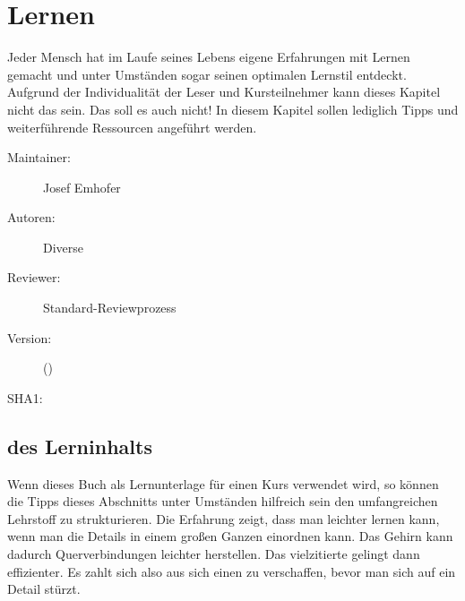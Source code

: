 \def\ChapterCode{LER}
\chapter
[\CO{[LER]} Lernen]
{Lernen} 

\ChapterIntro
{%
Jeder Mensch hat im Laufe seines Lebens eigene Erfahrungen
mit Lernen gemacht und unter Umständen sogar seinen
optimalen Lernstil entdeckt. Aufgrund der Individualität der
Leser und Kursteilnehmer kann dieses Kapitel nicht das
 sein. Das soll es
auch nicht! In diesem Kapitel sollen lediglich Tipps und
weiterführende Ressourcen angeführt werden.
}
{%
\begin{description}
  \item[Maintainer:] Josef Emhofer
  \item[Autoren:] Diverse
  \item[Reviewer:] Standard-Reviewprozess
  \item[Version:] {\VarDocVersionTypeName} ({\VarDocVersionTypeDescription})
  \item[SHA1:] {\DocGitCommit}
\end{description}

{\TxTeilkapitelAASS}
}

\section{ des Lerninhalts}
Wenn dieses Buch als Lernunterlage für einen Kurs verwendet
wird, so können die Tipps dieses Abschnitts unter Umständen
hilfreich sein den umfangreichen Lehrstoff zu strukturieren.
Die Erfahrung zeigt, dass man leichter lernen kann, wenn man
die Details in einem großen Ganzen einordnen kann. Das
Gehirn kann dadurch Querverbindungen leichter herstellen.
Das vielzitierte 
gelingt dann effizienter. Es zahlt sich also aus sich einen
 zu verschaffen, bevor man sich auf ein Detail
stürzt.

